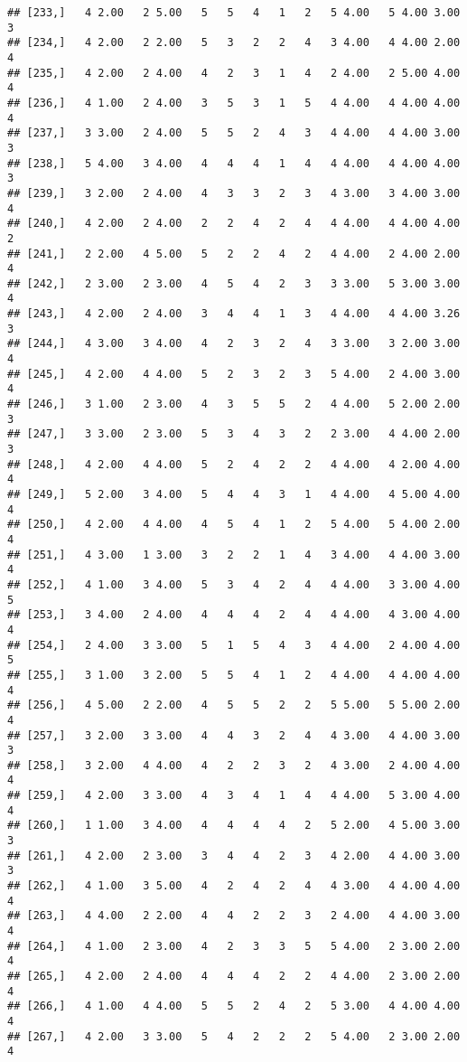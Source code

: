 \documentclass[]{article}
\begin{document}
\begin{verbatim}
## [233,]   4 2.00   2 5.00   5   5   4   1   2   5 4.00   5 4.00 3.00   3
## [234,]   4 2.00   2 2.00   5   3   2   2   4   3 4.00   4 4.00 2.00   4
## [235,]   4 2.00   2 4.00   4   2   3   1   4   2 4.00   2 5.00 4.00   4
## [236,]   4 1.00   2 4.00   3   5   3   1   5   4 4.00   4 4.00 4.00   4
## [237,]   3 3.00   2 4.00   5   5   2   4   3   4 4.00   4 4.00 3.00   3
## [238,]   5 4.00   3 4.00   4   4   4   1   4   4 4.00   4 4.00 4.00   3
## [239,]   3 2.00   2 4.00   4   3   3   2   3   4 3.00   3 4.00 3.00   4
## [240,]   4 2.00   2 4.00   2   2   4   2   4   4 4.00   4 4.00 4.00   2
## [241,]   2 2.00   4 5.00   5   2   2   4   2   4 4.00   2 4.00 2.00   4
## [242,]   2 3.00   2 3.00   4   5   4   2   3   3 3.00   5 3.00 3.00   4
## [243,]   4 2.00   2 4.00   3   4   4   1   3   4 4.00   4 4.00 3.26   3
## [244,]   4 3.00   3 4.00   4   2   3   2   4   3 3.00   3 2.00 3.00   4
## [245,]   4 2.00   4 4.00   5   2   3   2   3   5 4.00   2 4.00 3.00   4
## [246,]   3 1.00   2 3.00   4   3   5   5   2   4 4.00   5 2.00 2.00   3
## [247,]   3 3.00   2 3.00   5   3   4   3   2   2 3.00   4 4.00 2.00   3
## [248,]   4 2.00   4 4.00   5   2   4   2   2   4 4.00   4 2.00 4.00   4
## [249,]   5 2.00   3 4.00   5   4   4   3   1   4 4.00   4 5.00 4.00   4
## [250,]   4 2.00   4 4.00   4   5   4   1   2   5 4.00   5 4.00 2.00   4
## [251,]   4 3.00   1 3.00   3   2   2   1   4   3 4.00   4 4.00 3.00   4
## [252,]   4 1.00   3 4.00   5   3   4   2   4   4 4.00   3 3.00 4.00   5
## [253,]   3 4.00   2 4.00   4   4   4   2   4   4 4.00   4 3.00 4.00   4
## [254,]   2 4.00   3 3.00   5   1   5   4   3   4 4.00   2 4.00 4.00   5
## [255,]   3 1.00   3 2.00   5   5   4   1   2   4 4.00   4 4.00 4.00   4
## [256,]   4 5.00   2 2.00   4   5   5   2   2   5 5.00   5 5.00 2.00   4
## [257,]   3 2.00   3 3.00   4   4   3   2   4   4 3.00   4 4.00 3.00   3
## [258,]   3 2.00   4 4.00   4   2   2   3   2   4 3.00   2 4.00 4.00   4
## [259,]   4 2.00   3 3.00   4   3   4   1   4   4 4.00   5 3.00 4.00   4
## [260,]   1 1.00   3 4.00   4   4   4   4   2   5 2.00   4 5.00 3.00   3
## [261,]   4 2.00   2 3.00   3   4   4   2   3   4 2.00   4 4.00 3.00   3
## [262,]   4 1.00   3 5.00   4   2   4   2   4   4 3.00   4 4.00 4.00   4
## [263,]   4 4.00   2 2.00   4   4   2   2   3   2 4.00   4 4.00 3.00   4
## [264,]   4 1.00   2 3.00   4   2   3   3   5   5 4.00   2 3.00 2.00   4
## [265,]   4 2.00   2 4.00   4   4   4   2   2   4 4.00   2 3.00 2.00   4
## [266,]   4 1.00   4 4.00   5   5   2   4   2   5 3.00   4 4.00 4.00   4
## [267,]   4 2.00   3 3.00   5   4   2   2   2   5 4.00   2 3.00 2.00   4

\end{verbatim}
\end{document}
